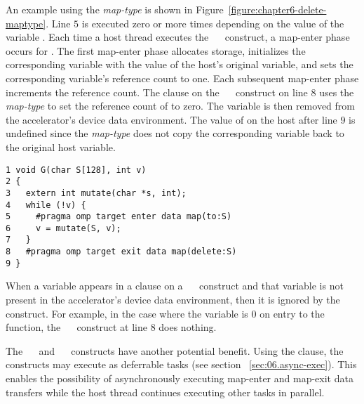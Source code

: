 
An example using the  \emph{map-type} is shown in
Figure~\ref{figure:chapter6-delete-maptype}.  Line $5$ is executed zero or more
times depending on the value of the variable .  Each time a host thread
executes the ~~ construct, a map-enter phase
occurs for .  The first map-enter phase allocates storage, initializes
the corresponding variable  with the value of the host's original 
variable, and sets the corresponding variable's reference count to one.  Each
subsequent map-enter phase increments the reference count.  The
 clause on the ~~ construct on
line $8$ uses the  \emph{map-type} to set the reference count of  to
zero.  The variable  is then removed from the accelerator's device data
environment.  The value of  on the host after line $9$ is undefined since
the  \emph{map-type} does not copy the corresponding variable back
to the original host variable.

\begin{figure*}[!tb]
\begin{verbatim}
1 void G(char S[128], int v)
2 {
3   extern int mutate(char *s, int);
4   while (!v) {
5     #pragma omp target enter data map(to:S)
6     v = mutate(S, v);
7   }
8   #pragma omp target exit data map(delete:S)
9 }
\end{verbatim}
\caption{ \textbf {Example of the delete map-type} -- \small
          Regardless of its reference count, remove \texttt{S} from an     
          accelerator's device data environment.
         }
\label{figure:chapter6-delete-maptype}
\end{figure*}

When a variable appears in a  clause on a
~~ construct and that variable is not
present in the accelerator's device data environment, then it is ignored
by the construct.  For example, in the case where the variable  is 0 on
entry to the function, the ~~ construct at
line $8$ does nothing.

The ~~ and ~~ 
constructs have another potential benefit.  Using the
 clause, the constructs may execute as
deferrable tasks (see section~ \ref{sec:06.async-exec}).  This enables the
possibility of asynchronously executing map-enter and map-exit data transfers
while the host thread continues executing other tasks in parallel.

